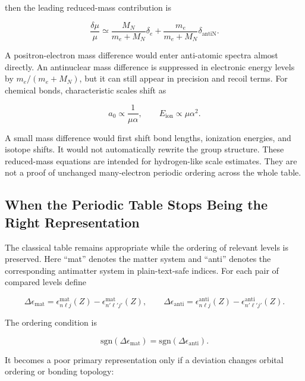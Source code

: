 \documentclass[11pt,a4paper]{article}
\begin{document}
then the leading reduced-mass contribution is

\begin{equation}
\frac{\delta\mu}{\mu}
\simeq
\frac{M_N}{m_e+M_N}\delta_e
+
\frac{m_e}{m_e+M_N}\delta_{\mathrm{antiN}} .
\label{eq:reduced-mass-shift}
\end{equation}

A positron-electron mass difference would enter anti-atomic spectra almost directly. An antinuclear mass difference is suppressed in electronic energy levels by $m_e/(m_e+M_N)$, but it can still appear in precision and recoil terms. For chemical bonds, characteristic scales shift as

\begin{equation}
a_0 \propto \frac{1}{\mu\alpha},
\qquad
E_{\mathrm{ion}}\propto \mu\alpha^2 .
\end{equation}

A small mass difference would first shift bond lengths, ionization energies, and isotope shifts. It would not automatically rewrite the group structure.
These reduced-mass equations are intended for hydrogen-like scale estimates. They are not a proof of unchanged many-electron periodic ordering across the whole table.

\subsection{When the Periodic Table Stops Being the Right Representation}

The classical table remains appropriate while the ordering of relevant levels is preserved. Here \enquote{mat} denotes the matter system and \enquote{anti} denotes the corresponding antimatter system in plain-text-safe indices. For each pair of compared levels define

\begin{equation}
\Delta\epsilon_{\mathrm{mat}}
=
\epsilon_{n\ell j}^{\mathrm{mat}}(Z)-\epsilon_{n'\ell'j'}^{\mathrm{mat}}(Z),
\qquad
\Delta\epsilon_{\mathrm{anti}}
=
\epsilon_{n\ell j}^{\mathrm{anti}}(Z)-\epsilon_{n'\ell'j'}^{\mathrm{anti}}(Z).
\end{equation}

The ordering condition is

\begin{equation}
\mathrm{sgn}(\Delta\epsilon_{\mathrm{mat}})
=
\mathrm{sgn}(\Delta\epsilon_{\mathrm{anti}}) .
\end{equation}

It becomes a poor primary representation only if a deviation changes orbital ordering or bonding topology:
\end{document}
